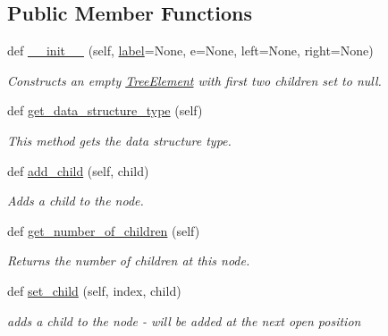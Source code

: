 \subsection*{Public Member Functions}
\begin{DoxyCompactItemize}
\item 
def \mbox{\hyperlink{class_bridges_1_1_tree_element_1_1_tree_element_a523764e27ed94055175b22574b730046}{\+\_\+\+\_\+init\+\_\+\+\_\+}} (self, \mbox{\hyperlink{class_bridges_1_1_element_1_1_element_a301fe5be8cf72b2c62f6a218feeb9166}{label}}=None, e=None, left=None, right=None)
\begin{DoxyCompactList}\small\item\em Constructs an empty \mbox{\hyperlink{class_bridges_1_1_tree_element_1_1_tree_element}{Tree\+Element}} with first two children set to null. \end{DoxyCompactList}\item 
def \mbox{\hyperlink{class_bridges_1_1_tree_element_1_1_tree_element_ae86084b9e0f55f0cd37ea451de956c48}{get\+\_\+data\+\_\+structure\+\_\+type}} (self)
\begin{DoxyCompactList}\small\item\em This method gets the data structure type. \end{DoxyCompactList}\item 
def \mbox{\hyperlink{class_bridges_1_1_tree_element_1_1_tree_element_a0d2549b396118f42d741ef1d53b721a4}{add\+\_\+child}} (self, child)
\begin{DoxyCompactList}\small\item\em Adds a child to the node. \end{DoxyCompactList}\item 
def \mbox{\hyperlink{class_bridges_1_1_tree_element_1_1_tree_element_a6a557bdf0d8e98009f3e4e960f01cf24}{get\+\_\+number\+\_\+of\+\_\+children}} (self)
\begin{DoxyCompactList}\small\item\em Returns the number of children at this node. \end{DoxyCompactList}\item 
def \mbox{\hyperlink{class_bridges_1_1_tree_element_1_1_tree_element_ac03788ed77411b40ba69fb7cce00b3f8}{set\+\_\+child}} (self, index, child)
\begin{DoxyCompactList}\small\item\em adds a child to the node -\/ will be added at the next open position \end{DoxyCompactList}\item 

\end{DoxyCompactItemize}
